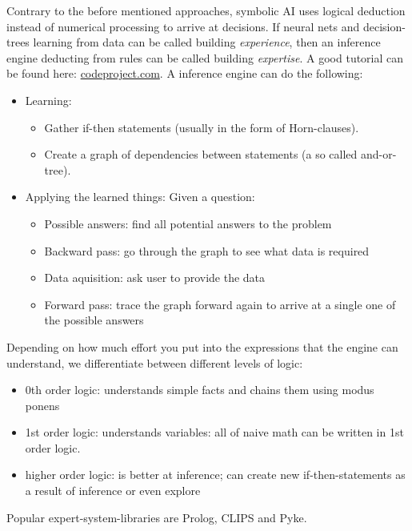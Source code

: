 Contrary to the before mentioned approaches, symbolic AI uses logical deduction instead of numerical processing to arrive at decisions. If neural nets and decision-trees learning from data can be called building \emph{experience}, then an inference engine deducting from rules can be called building \emph{expertise}. A good tutorial can be found here: \href{codeproject.com/Articles/179375/Man-Marriage-and-Machine-Adventures-in-Artificia}{codeproject.com}.
A inference engine can do the following: 
\begin{itemize}
	\item Learning: 
		\begin{itemize}
			\item Gather if-then statements (usually in the form of Horn-clauses).
			\item Create a graph of dependencies between statements (a so called and-or-tree).
		\end{itemize}
	\item Applying the learned things: Given a question: 
		\begin{itemize}
			\item Possible answers: find all potential answers to the problem
			\item Backward pass: go through the graph to see what data is required
			\item Data aquisition: ask user to provide the data
			\item Forward pass: trace the graph forward again to arrive at a single one of the possible answers
		\end{itemize}
\end{itemize}

Depending on how much effort you put into the expressions that the engine can understand, we differentiate between different levels of logic: 
\begin{itemize}
    \item 0th order logic: understands simple facts and chains them using modus ponens
    \item 1st order logic: understands variables: all of naive math can be written in 1st order logic.
    \item higher order logic: is better at inference; can create new if-then-statements as a result of inference or even explore
\end{itemize}

Popular expert-system-libraries are Prolog, CLIPS and Pyke.


